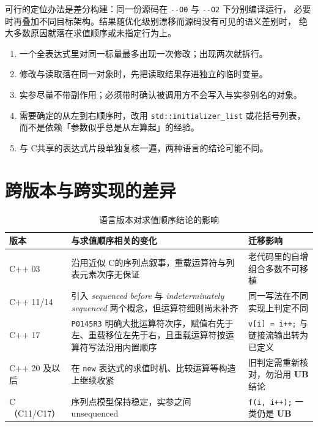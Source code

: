 \documentclass[12pt,a4paper,fontset=fandol]{ctexbook}
\newcommand{\Tp}[1]{\texttt{#1}}
\newcommand{\Opt}[1]{\texttt{-\/-#1}}
\newcommand{\Lang}[1]{\textsf{#1}}
\newcommand{\CL}{\Lang{C}}
\newcommand{\CPP}{\Lang{C++}}
\newcommand{\UB}{\textbf{\textsf{UB}}}
\newcommand{\Feat}[1]{\texttt{#1}}
\begin{document}
可行的定位办法是差分构建：同一份源码在 \Opt{O0} 与 \Opt{O2} 下分别编译运行，
必要时再叠加不同目标架构。结果随优化级别漂移而源码没有可见的语义差别时，
绝大多数原因就落在求值顺序或未指定行为上。

\begin{bestpractice}[title={顺序敏感代码的自查清单}]
\begin{enumerate}
\item 一个全表达式里对同一标量最多出现一次修改；出现两次就拆行。
\item 修改与读取落在同一对象时，先把读取结果存进独立的临时变量。
\item 实参尽量不带副作用；必须带时确认被调用方不会写入与实参别名的对象。
\item 需要确定的从左到右顺序时，改用 \Tp{std::initializer\_list} 或花括号列表，
      而不是依赖「参数似乎总是从左算起」的经验。
\item 与 \CL 共享的表达式片段单独复核一遍，两种语言的结论可能不同。
\end{enumerate}
\end{bestpractice}

\section{跨版本与跨实现的差异}\label{sec:ub08-versions}

\begin{table}[htbp]
\centering
\begin{tabularx}{0.78\textwidth}{>{\raggedright\arraybackslash}p{} >{\raggedright\arraybackslash}X >{\raggedright\arraybackslash}p{}}
\toprule
版本 & 与求值顺序相关的变化 & 迁移影响 \\
\midrule
\CPP{} 03 & 沿用近似 \CL 的序列点叙事，重载运算符与列表元素次序无保证 & 老代码里的自增组合多数不可移植 \\
\CPP{} 11/14 & 引入 \emph{sequenced before} 与 \emph{indeterminately sequenced} 两个概念，但运算符细则尚未补齐 & 同一写法在不同实现上判定不同 \\
\CPP{} 17 & \Feat{P0145R3} 明确大批运算符次序，赋值右先于左、重载移位左先于右，且重载运算符按运算符写法沿用内置顺序 & \Tp{v[i] = i++;} 与链接流输出转为已定义 \\
\CPP{} 20 及以后 & 在 \Tp{new} 表达式的求值时机、比较运算等构造上继续收紧 & 旧判定需重新核对，勿沿用 \UB{} 结论 \\
\CL（C11/C17） & 序列点模型保持稳定，实参之间 unsequenced & \Tp{f(i, i++);} 一类仍是 \UB{} \\
\bottomrule
\end{tabularx}
\caption{语言版本对求值顺序结论的影响}
\label{tab:ub08-versions}
\end{table}
\end{document}
